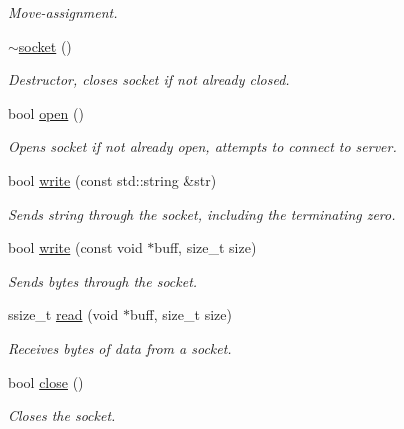 \begin{DoxyCompactItemize}
\begin{DoxyCompactList}\small\item\em Move-\/assignment. \end{DoxyCompactList}\item 
\mbox{\label{classcpen333_1_1process_1_1windows_1_1socket_a56e499069a530a1e4484e098ed39c799}} 
\hyperlink{classcpen333_1_1process_1_1windows_1_1socket_a56e499069a530a1e4484e098ed39c799}{$\sim$socket} ()
\begin{DoxyCompactList}\small\item\em Destructor, closes socket if not already closed. \end{DoxyCompactList}\item 
bool \hyperlink{classcpen333_1_1process_1_1windows_1_1socket_a6d75767fbb202435906eac08a0e63c28}{open} ()
\begin{DoxyCompactList}\small\item\em Opens socket if not already open, attempts to connect to server. \end{DoxyCompactList}\item 
bool \hyperlink{classcpen333_1_1process_1_1windows_1_1socket_add8c60c2bff8d2c4339e38e2bb92f6d7}{write} (const std\+::string \&str)
\begin{DoxyCompactList}\small\item\em Sends string through the socket, including the terminating zero. \end{DoxyCompactList}\item 
bool \hyperlink{classcpen333_1_1process_1_1windows_1_1socket_a62255247b7e8a9963e9ae5c24c6e5348}{write} (const void $\ast$buff, size\+\_\+t size)
\begin{DoxyCompactList}\small\item\em Sends bytes through the socket. \end{DoxyCompactList}\item 
ssize\+\_\+t \hyperlink{classcpen333_1_1process_1_1windows_1_1socket_ab7445d28dd8866ee19d7ed4e35a8ba10}{read} (void $\ast$buff, size\+\_\+t size)
\begin{DoxyCompactList}\small\item\em Receives bytes of data from a socket. \end{DoxyCompactList}\item 
bool \hyperlink{classcpen333_1_1process_1_1windows_1_1socket_a27d44e55f1159dec27f5dc02f429ae8c}{close} ()
\begin{DoxyCompactList}\small\item\em Closes the socket. \end{DoxyCompactList}\end{DoxyCompactItemize}
